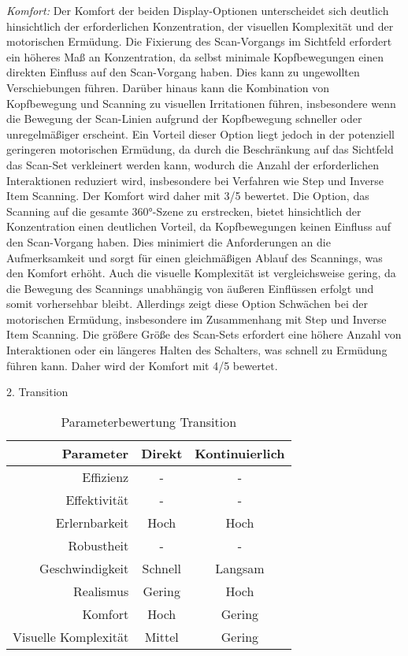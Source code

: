 \textit{Komfort:}
Der Komfort der beiden Display-Optionen unterscheidet sich deutlich hinsichtlich der erforderlichen Konzentration, der visuellen Komplexität und der motorischen Ermüdung.
Die Fixierung des Scan-Vorgangs im Sichtfeld erfordert ein höheres Maß an Konzentration, da selbst minimale Kopfbewegungen einen direkten Einfluss auf den Scan-Vorgang haben. Dies kann zu ungewollten Verschiebungen führen. Darüber hinaus kann die Kombination von Kopfbewegung und Scanning zu visuellen Irritationen führen, insbesondere wenn die Bewegung der Scan-Linien aufgrund der Kopfbewegung schneller oder unregelmäßiger erscheint. Ein Vorteil dieser Option liegt jedoch in der potenziell geringeren motorischen Ermüdung, da durch die Beschränkung auf das Sichtfeld das Scan-Set verkleinert werden kann, wodurch die Anzahl der erforderlichen Interaktionen reduziert wird, insbesondere bei Verfahren wie Step und Inverse Item Scanning. Der Komfort wird daher mit 3/5 bewertet. 
Die Option, das Scanning auf die gesamte 360°-Szene zu erstrecken, bietet hinsichtlich der Konzentration einen deutlichen Vorteil, da Kopfbewegungen keinen Einfluss auf den Scan-Vorgang haben. Dies minimiert die Anforderungen an die Aufmerksamkeit und sorgt für einen gleichmäßigen Ablauf des Scannings, was den Komfort erhöht. Auch die visuelle Komplexität ist vergleichsweise gering, da die Bewegung des Scannings unabhängig von äußeren Einflüssen erfolgt und somit vorhersehbar bleibt. Allerdings zeigt diese Option Schwächen bei der motorischen Ermüdung, insbesondere im Zusammenhang mit Step und Inverse Item Scanning. Die größere Größe des Scan-Sets erfordert eine höhere Anzahl von Interaktionen oder ein längeres Halten des Schalters, was schnell zu Ermüdung führen kann. Daher wird der Komfort mit 4/5 bewertet. 

2. Transition 

\begin{table}[ht]
 \centering
 \begin{tabular}{r|c|c}
 Parameter & Direkt & Kontinuierlich\\
 \hline
 Effizienz & - & -\\
 Effektivität & - & -\\
 Erlernbarkeit & Hoch & Hoch\\
 Robustheit & - & -\\
 Geschwindigkeit & Schnell & Langsam\\
 Realismus & Gering & Hoch \\
 Komfort & Hoch & Gering\\
 Visuelle Komplexität & Mittel & Gering
 \end{tabular}
 \caption{Parameterbewertung Transition}
 \label{tab:Transition}
\end{table}

